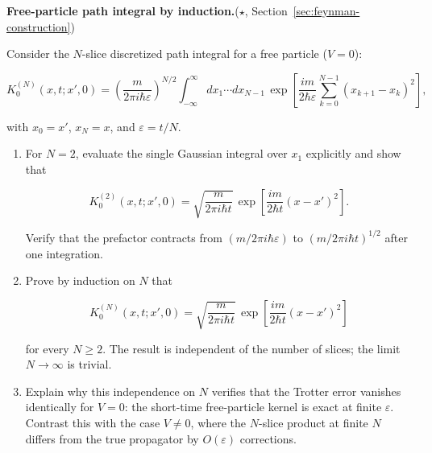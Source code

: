 \begin{problemset}

\item[1.] \textbf{Free-particle path integral by induction.}\quad($\star$, Section~\ref{sec:feynman-construction})

Consider the $N$-slice discretized path integral for a free particle ($V=0$):
\begin{linenomath}
\begin{equation}
K_0^{(N)}(x,t;x',0) = \left(\frac{m}{2\pi i\hbar\varepsilon}\right)^{N/2}
\int_{-\infty}^{\infty} dx_1\cdots dx_{N-1}\,
\exp\left[\frac{im}{2\hbar\varepsilon}\sum_{k=0}^{N-1}(x_{k+1}-x_k)^2\right],
\end{equation}
\end{linenomath}
with $x_0 = x'$, $x_N = x$, and $\varepsilon = t/N$.

\begin{enumerate}
\item[(a)] For $N=2$, evaluate the single Gaussian integral over $x_1$ explicitly and show that
\begin{linenomath}
\begin{equation}
K_0^{(2)}(x,t;x',0) = \sqrt{\frac{m}{2\pi i\hbar t}}\,
\exp\left[\frac{im}{2\hbar t}(x-x')^2\right].
\end{equation}
\end{linenomath}
Verify that the prefactor contracts from $(m/2\pi i\hbar\varepsilon)$ to $(m/2\pi i\hbar t)^{1/2}$ after one integration.

\item[(b)] Prove by induction on $N$ that
\begin{linenomath}
\begin{equation}
K_0^{(N)}(x,t;x',0) = \sqrt{\frac{m}{2\pi i\hbar t}}\,
\exp\left[\frac{im}{2\hbar t}(x-x')^2\right]
\end{equation}
\end{linenomath}
for every $N \ge 2$. The result is independent of the number of slices; the limit $N\to\infty$ is trivial.

\item[(c)] Explain why this independence on $N$ verifies that the Trotter error vanishes identically for $V=0$: the short-time free-particle kernel is exact at finite $\varepsilon$. Contrast this with the case $V \neq 0$, where the $N$-slice product at finite $N$ differs from the true propagator by $O(\varepsilon)$ corrections.
\end{enumerate}


\end{problemset}
